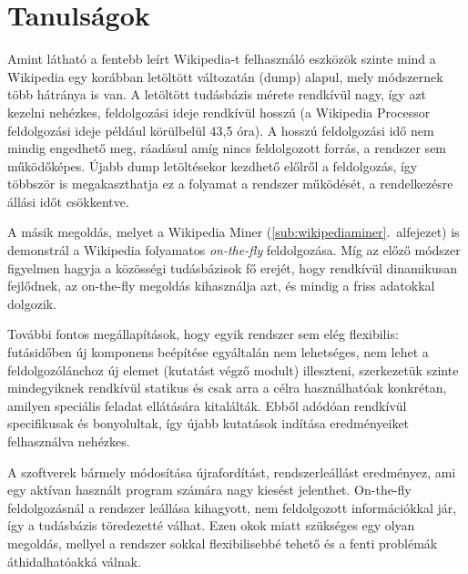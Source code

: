 
\section{Tanulságok}
\label{sec:conclusion}

Amint látható a fentebb leírt Wikipedia-t felhasználó eszközök szinte mind a Wikipedia egy korábban letöltött változatán (dump) alapul, mely módszernek több hátránya is van. A letöltött tudásbázis mérete rendkívül nagy, így azt kezelni nehézkes, feldolgozási ideje rendkívül hosszú (a Wikipedia Processor feldolgozási ideje például körülbelül 43,5 óra). A hosszú feldolgozási idő nem mindig engedhető meg, ráadásul amíg nincs feldolgozott forrás, a rendszer sem működőképes. Újabb dump letöltésekor kezdhető előlről a feldolgozás, így többször is megakaszthatja ez a folyamat a rendszer működését, a rendelkezésre állási időt csökkentve.

A másik megoldás, melyet a Wikipedia Miner (\ref{sub:wikipediaminer}.~alfejezet) is demonstrál a Wikipedia folyamatos \textit{on-the-fly} feldolgozása. Míg az előző módszer figyelmen hagyja a közösségi tudásbázisok fő erejét, hogy rendkívül dinamikusan fejlődnek, az on-the-fly megoldás kihasználja azt, és mindig a friss adatokkal dolgozik.

További fontos megállapítások, hogy egyik rendszer sem elég flexibilis: futásidőben új komponens beépítése egyáltalán nem lehetséges, nem lehet a feldolgozólánchoz új elemet (kutatást végző modult) illeszteni, szerkezetük szinte mindegyiknek rendkívül statikus és csak arra a célra használhatóak konkrétan, amilyen speciális feladat ellátására kitalálták. Ebből adódóan rendkívül specifikusak és bonyolultak, így újabb kutatások indítása eredményeiket felhasználva nehézkes.

A szoftverek bármely módosítása újrafordítást, rendszerleállást eredményez, ami egy aktívan használt program számára nagy kiesést jelenthet. On-the-fly feldolgozásnál a rendszer leállása kihagyott, nem feldolgozott információkkal jár, így a tudásbázis töredezetté válhat. Ezen okok miatt szükséges egy olyan megoldás, mellyel a rendszer sokkal flexibilisebbé tehető és a fenti problémák áthidalhatóakká válnak.


